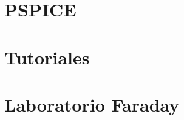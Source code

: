\documentclass[12pt, twoside, openright]{report} %
\begin{document}
\part{PSPICE}


\part{Tutoriales}



\part{Laboratorio Faraday}


\end{document}
